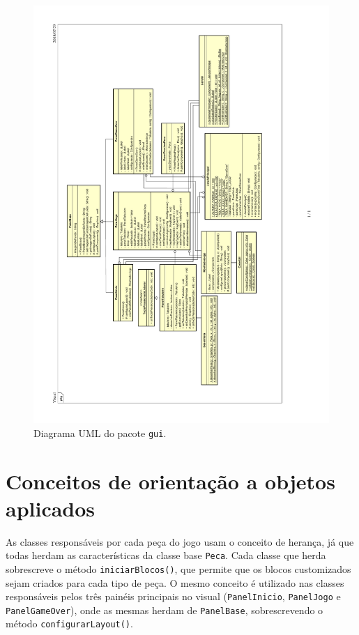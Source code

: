\documentclass[a4paper, 12pt]{article}
\begin{document}
  \begin{landscape}
  \begin{figure}
    \centering
    \includegraphics[angle=-90,trim=2.3cm 2cm 4cm 2cm,clip]{diagram/package-gui.pdf}
    \caption{Diagrama UML do pacote \texttt{gui}.}
  \end{figure}
  \end{landscape}

  \section{Conceitos de orientação a objetos aplicados}

  As classes responsáveis por cada peça do jogo usam o conceito de herança,
  já que todas herdam as características da classe base \texttt{Peca}.
  Cada classe que herda sobrescreve o método \texttt{iniciarBlocos()},
  que permite que os blocos customizados sejam criados para cada tipo
  de peça. O mesmo conceito  é utilizado nas classes responsáveis pelos
  três painéis principais no visual (\texttt{PanelInicio}, \texttt{PanelJogo} 
  e \texttt{PanelGameOver}), onde as mesmas herdam de \texttt{PanelBase},
  sobrescrevendo o método \texttt{configurarLayout()}.
\end{document}
